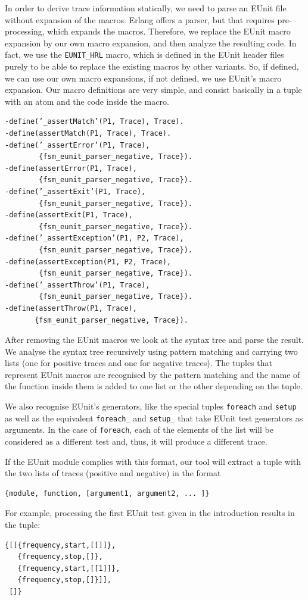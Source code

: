 \documentclass[]{sigplanconf}
\begin{document}
In order to derive trace information statically, we need to parse an EUnit file without  expansion of the macros. Erlang offers a parser, but that requires pre-processing, which expands the macros.
Therefore, we replace the EUnit macro expansion by our own macro expansion, and then analyze the resulting code. In fact, we use the \verb+EUNIT_HRL+ macro, which is defined in the EUnit 
header files purely to be able to replace the existing macros by other variants. So, if defined, we can use our own macro expansions, if not defined, we use EUnit’s macro expansion.
Our macro definitions are very simple, and consist basically in a tuple with an atom and the code inside the macro.

\begin{verbatim}
-define(’_assertMatch’(P1, Trace), Trace). 
-define(assertMatch(P1, Trace), Trace).
-define(’_assertError’(P1, Trace), 
        {fsm_eunit_parser_negative, Trace}).
-define(assertError(P1, Trace), 
        {fsm_eunit_parser_negative, Trace}).
-define(’_assertExit’(P1, Trace),
        {fsm_eunit_parser_negative, Trace}).
-define(assertExit(P1, Trace), 
        {fsm_eunit_parser_negative, Trace}).
-define(’_assertException’(P1, P2, Trace), 
        {fsm_eunit_parser_negative, Trace}).
-define(assertException(P1, P2, Trace), 
        {fsm_eunit_parser_negative, Trace}).
-define(’_assertThrow’(P1, Trace), 
        {fsm_eunit_parser_negative, Trace}).
-define(assertThrow(P1, Trace), 
       {fsm_eunit_parser_negative, Trace}).
\end{verbatim}

After removing the EUnit macros we look at the syntax tree and parse the result. We analyse the syntax tree recursively using pattern matching and carrying two lists (one for positive traces and one for negative traces). The tuples that represent EUnit macros are recognised by the pattern matching and the name of the function inside them is added to one list or the other depending on the tuple.


We also recognise EUnit's generators, like the special tuples \texttt{foreach} and
\texttt{setup} as well as the equivalent \texttt{foreach\_}
and \texttt{setup\_} that take EUnit test generators as arguments. In the case of \texttt{foreach},
each of the elements of the list will be considered as a different test
and, thus, it will produce a different trace.


If the EUnit module complies with this format, our tool will extract
a tuple with the two lists of traces (positive and negative) in the format
\begin{verbatim}
{module, function, [argument1, argument2, ... ]}
\end{verbatim}
For example, processing the first EUnit test given in the introduction results in the tuple:
\begin{verbatim}
{[[{frequency,start,[[]]},
   {frequency,stop,[]},
   {frequency,start,[[1]]},
   {frequency,stop,[]}]],
 []}
\end{verbatim}
\end{document}
